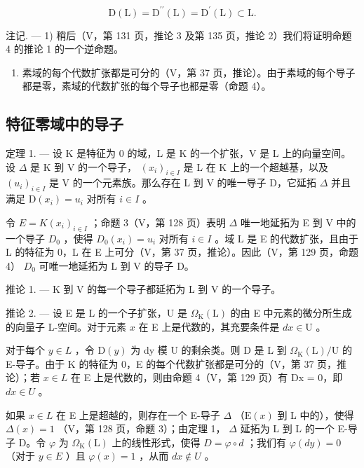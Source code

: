 \[
\mathrm{D} (\mathrm{L}) = \mathrm{D} ^ {\prime \prime} (\mathrm{L}) = \mathrm{D} ^ {\prime} (\mathrm{L}) \subset \mathrm{L}.
\]

注记. --- 1) 稍后（V，第 131 页，推论 3 及第 135 页，推论 2）我们将证明命题 4 的推论 1 的一个逆命题。

\begin{enumerate}
\def\labelenumi{\arabic{enumi})}
\setcounter{enumi}{1}
\tightlist
\item
  素域的每个代数扩张都是可分的（V，第 37 页，推论）。由于素域的每个导子都是零，素域的代数扩张的每个导子也都是零（命题 4）。
\end{enumerate}

\subsection{特征零域中的导子}

定理 1. --- 设 K 是特征为 0 的域，L 是 K 的一个扩张，V 是 L 上的向量空间。设 \(\Delta\) 是 K 到 V 的一个导子， \((x_{i})_{i\in I}\) 是 L 在 K 上的一个超越基，以及 \((u_{i})_{i\in I}\) 是 V 的一个元素族。那么存在 L 到 V 的唯一导子 D，它延拓 \(\Delta\) 并且满足 \(\mathrm{D}(x_{i})=u_{i}\) 对所有 \(i\in I\) 。

令 \(E = K(x_{i})_{i \in I}\) ；命题 3（V，第 128 页）表明 \(\Delta\) 唯一地延拓为 E 到 V 中的一个导子 \(D_{0}\) ，使得 \(D_{0}(x_{i}) = u_{i}\) 对所有 \(i \in I\) 。域 L 是 E 的代数扩张，且由于 L 的特征为 0，L 在 E 上可分（V，第 37 页，推论）。因此（V，第 129 页，命题 4） \(D_{0}\) 可唯一地延拓为 L 到 V 的导子 D。

推论 1. --- K 到 V 的每一个导子都延拓为 L 到 V 的一个导子。

推论 2. --- 设 E 是 L 的一个子扩张，U 是 \(\Omega_{\mathrm{K}}(\mathrm{L})\) 的由 E 中元素的微分所生成的向量子 L-空间。对于元素 \(x\) 在 E 上是代数的，其充要条件是 \(dx \in \mathrm{U}\) 。

对于每个 \(y \in L\) ，令 \(\mathrm{D}(y)\) 为 dy 模 U 的剩余类。则 D 是 L 到 \(\Omega_{\mathrm{K}}(\mathrm{L})/\mathrm{U}\) 的 E-导子。由于 K 的特征为 0，E 的每个代数扩张都是可分的（V，第 37 页，推论）；若 \(x \in L\) 在 E 上是代数的，则由命题 4（V，第 129 页）有 Dx = 0，即 \(dx \in U\) 。

如果 \(x \in L\) 在 E 上是超越的，则存在一个 E-导子 \(\Delta\) （\(\mathrm{E}(x)\) 到 L 中的），使得 \(\Delta(x) = 1\) （V，第 128 页，命题 3）；由定理 1， \(\Delta\) 延拓为 L 到 L 的一个 E-导子 D。令 \(\varphi\) 为 \(\Omega_{\mathrm{K}}(\mathrm{L})\) 上的线性形式，使得 \(D = \varphi \circ d\) ；我们有 \(\varphi(dy) = 0\) （对于 \(y \in E\) ）且 \(\varphi(x) = 1\) ，从而 \(dx \notin U\) 。

